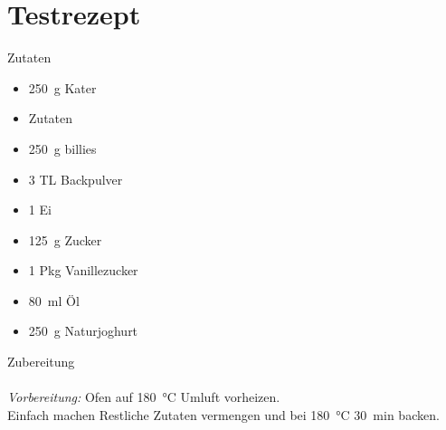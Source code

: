 \section*{Testrezept}
\ihead{}\ohead{}
\cfoot{}
{\Large Zutaten}
\begin{multicols}{2}
\begin{itemize}
    \item \SI{250}{g} Kater
    \item Zutaten
    \item \SI{250}{g} billies
    \item \num{3} TL Backpulver
    \item \num{1} Ei
    \item \SI{125}{g} Zucker
    \item \num{1} Pkg Vanillezucker
    \item \SI{80}{ml} Öl
    \item \SI{250}{g} Naturjoghurt
\end{itemize}
\end{multicols}
\noindent
{\Large Zubereitung}\\
\\
\textit{Vorbereitung:} Ofen auf \SI{180}{\celsius} Umluft vorheizen.\\
Einfach machen
Restliche Zutaten vermengen und bei \SI{180}{\celsius} \SI{30}{min} backen.
